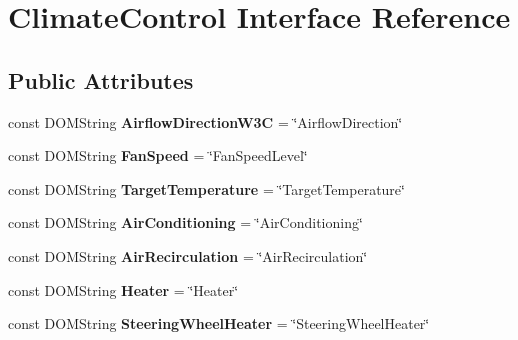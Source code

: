 \hypertarget{interfaceClimateControl}{\section{Climate\+Control Interface Reference}
\label{interfaceClimateControl}
}
\subsection*{Public Attributes}
\begin{DoxyCompactItemize}
\item 
\hypertarget{interfaceClimateControl_a745680c0e53b1f1946a433995d1b8322}{const D\+O\+M\+String {\bfseries Airflow\+Direction\+W3\+C} = \char`\"{}Airflow\+Direction\char`\"{}}\label{interfaceClimateControl_a745680c0e53b1f1946a433995d1b8322}

\item 
\hypertarget{interfaceClimateControl_a6973d35cb3f14659a1f26e8adb58979f}{const D\+O\+M\+String {\bfseries Fan\+Speed} = \char`\"{}Fan\+Speed\+Level\char`\"{}}\label{interfaceClimateControl_a6973d35cb3f14659a1f26e8adb58979f}

\item 
\hypertarget{interfaceClimateControl_ad3c6b2948978b0449add3fb7d25d930f}{const D\+O\+M\+String {\bfseries Target\+Temperature} = \char`\"{}Target\+Temperature\char`\"{}}\label{interfaceClimateControl_ad3c6b2948978b0449add3fb7d25d930f}

\item 
\hypertarget{interfaceClimateControl_a9ff614cf24e39060d34b088eb236bbb2}{const D\+O\+M\+String {\bfseries Air\+Conditioning} = \char`\"{}Air\+Conditioning\char`\"{}}\label{interfaceClimateControl_a9ff614cf24e39060d34b088eb236bbb2}

\item 
\hypertarget{interfaceClimateControl_ab72e5a305fcd31445bb825fc59cfff3b}{const D\+O\+M\+String {\bfseries Air\+Recirculation} = \char`\"{}Air\+Recirculation\char`\"{}}\label{interfaceClimateControl_ab72e5a305fcd31445bb825fc59cfff3b}

\item 
\hypertarget{interfaceClimateControl_a543c57595a9c02c78a4d5cdd0a8115f7}{const D\+O\+M\+String {\bfseries Heater} = \char`\"{}Heater\char`\"{}}\label{interfaceClimateControl_a543c57595a9c02c78a4d5cdd0a8115f7}

\item 
\hypertarget{interfaceClimateControl_a604d4c5dcfb03b1a8bfee77ad2fddfa7}{const D\+O\+M\+String {\bfseries Steering\+Wheel\+Heater} = \char`\"{}Steering\+Wheel\+Heater\char`\"{}}\label{interfaceClimateControl_a604d4c5dcfb03b1a8bfee77ad2fddfa7}


\end{DoxyCompactItemize}
